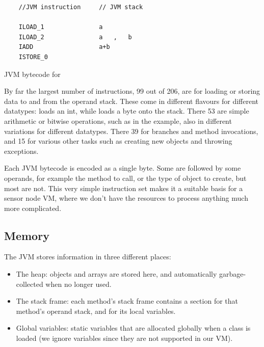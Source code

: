 \begin{listing}
    \centering
    \begin{verbatim}
    //JVM instruction     // JVM stack

    ILOAD_1               a
    ILOAD_2               a   ,   b
    IADD                  a+b
    ISTORE_0
    \end{verbatim}
\caption{JVM bytecode for }
\label{lst-basic-jvm-bytecode-example}
\end{listing}

By far the largest number of instructions, 99 out of 206, are for loading or storing data to and from the operand stack. These come in different flavours for different datatypes:  loads an int, while  loads a byte onto the stack. There 53 are simple arithmetic or bitwise operations, such as  in the example, also in different variations for different datatypes. There 39 for branches and method invocations, and 15 for various other tasks such as creating new objects and throwing exceptions.

Each JVM bytecode is encoded as a single byte. Some are followed by some operands, for example the method to call, or the type of object to create, but most are not. This very simple instruction set makes it a suitable basis for a sensor node VM, where we don't have the resources to process anything much more complicated.

\subsection{Memory}
\label{sec-background-jvm-memory}
The JVM stores information in three different places:
\begin{itemize}
    \item The heap: objects and arrays are stored here, and automatically garbage-collected when no longer used.
    \item The stack frame: each method's stack frame contains a section for that method's operand stack, and for its local variables.
    \item Global variables: static variables that are allocated globally when a class is loaded (we ignore  variables since they are not supported in our VM).
\end{itemize}

